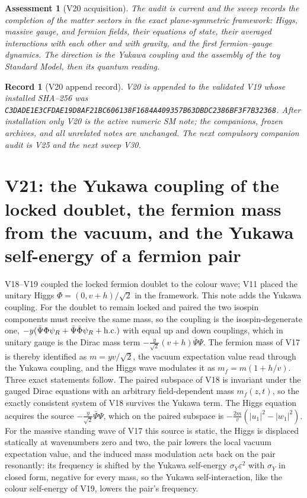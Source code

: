 \documentclass[11pt]{article}
\newtheorem{assessment}[theorem]{Assessment}
\newtheorem{record}[theorem]{Record}
\theoremstyle{remark}
\begin{document}
\begin{assessment}[V20 acquisition]
\label{ass:v20v20}
The audit is current and the sweep records the completion of the
matter sectors in the exact plane-symmetric framework: Higgs, massive
gauge, and fermion fields, their equations of state, their averaged
interactions with each other and with gravity, and the first
fermion--gauge dynamics.  The direction is the Yukawa coupling and
the assembly of the toy Standard Model, then its quantum reading.
\end{assessment}

\begin{record}[V20 append record]
\label{rec:v20v20}
V20 is appended to the validated V19 whose installed SHA--256 was
\texttt{C3DADE1E3CFDAE19D8AF21BC606138F1684A409357B63DBDC2386BF3F7B32368}.
After installation only V20 is the active numeric SM note; the
companions, frozen archives, and all unrelated notes are unchanged.
The next compulsory companion audit is V25 and the next sweep V30.
\end{record}


\section{V21: the Yukawa coupling of the locked doublet, the fermion mass from the vacuum, and the Yukawa self-energy of a fermion pair}
\label{sec:v20v21}

V18--V19 coupled the locked fermion doublet to the colour wave; V11
placed the unitary Higgs \(\Phi=(0,v+h)/\sqrt2\) in the framework.
This note adds the Yukawa coupling.  For the doublet to remain locked
and paired the two isospin components must receive the same mass, so
the coupling is the isospin-degenerate one,
\(-y(\bar\Psi\Phi\psi_R+\bar\Psi\tilde\Phi\psi_R+\hbox{h.c.})\) with
equal up and down couplings, which in unitary gauge is the Dirac mass
term \(-\tfrac{y}{\sqrt2}(v+h)\bar\Psi\Psi\).  The fermion mass of
V17 is thereby identified as \(m=yv/\sqrt2\), the vacuum expectation
value read through the Yukawa coupling, and the Higgs wave modulates
it as \(m_f=m(1+h/v)\).  Three exact statements follow.  The paired
subspace of V18 is invariant under the gauged Dirac equations with an
arbitrary field-dependent mass \(m_f(z,t)\), so the exactly consistent
system of V18 survives the Yukawa term.  The Higgs equation acquires
the source \(-\tfrac{y}{\sqrt2}\bar\Psi\Psi\), which on the paired
subspace is \(-\tfrac{2m}v(|u_1|^2-|w_1|^2)\).  For the massive
standing wave of V17 this source is static, the Higgs is displaced
statically at wavenumbers zero and two, the pair lowers the local
vacuum expectation value, and the induced mass modulation acts back
on the pair resonantly: its frequency is shifted by the Yukawa
self-energy \(\sigma_Y\varepsilon^2\) with \(\sigma_Y\) in closed form,
negative for every mass, so the Yukawa self-interaction, like the
colour self-energy of V19, lowers the pair's frequency.
\end{document}
